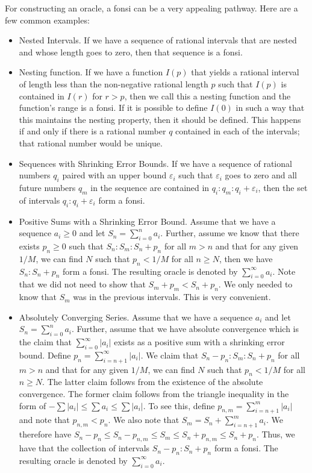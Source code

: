 \documentclass[12pt]{article}
\theoremstyle{remark}
\begin{document}
For constructing an oracle, a fonsi can be a very appealing pathway. Here are a few common examples: 

\begin{itemize}
    \item Nested Intervals. If we have a sequence of rational intervals that are nested and whose length goes to zero, then that sequence is a fonsi.
    \item Nesting function. If we have a function $I(p)$ that yields a rational interval of length less than the non-negative rational length $p$ such that $I(p)$ is contained in $I(r)$ for $r>p$, then we call this a nesting function and the function's range is a fonsi. If it is possible to define $I(0)$ in such a way that this maintains the nesting property, then it should be defined. This happens if and only if there is a rational number $q$ contained in each of the intervals; that rational number would be unique. 
    \item Sequences with Shrinking Error Bounds. If we have a sequence of rational numbers $q_i$ paired with an upper bound $\varepsilon_i$ such that $\varepsilon_i$ goes to zero and all future numbers $q_m$ in the sequence are contained in $q_i:q_m:q_i+\varepsilon_i$, then the set of intervals $q_i:q_i+\varepsilon_i$ form a fonsi. 
    \item Positive Sums with a Shrinking Error Bound. Assume that we have a sequence $a_i\geq 0$ and let $S_n = \sum_{i=0}^n a_i$. Further, assume we know that there exists $p_n \geq 0$ such that $S_n: S_m : S_n + p_n$ for all $m > n$ and that for any given $1/M$, we can find $N$ such that $p_n < 1/M$ for all $n \geq N$, then we have $S_n: S_n + p_n$ form a fonsi. The resulting oracle is denoted by $\sum_{i=0}^\infty a_i$. Note that we did not need to show that $S_m+p_m < S_n + p_n$. We only needed to know that $S_m$ was in the previous intervals. This is very convenient.
    \item Absolutely Converging Series. Assume that we have a sequence $a_i$ and let $S_n = \sum_{i=0}^n a_i$. Further, assume that we have absolute convergence which is the claim that $\sum_{i=0}^\infty |a_i|$ exists as a positive sum  with a shrinking error bound. Define $p_n = \sum_{i=n+1}^\infty |a_i|$. We claim that $S_n-p_n: S_m : S_n + p_n$ for all $m > n$ and that for any given $1/M$, we can find $N$ such that $p_n < 1/M$ for all $n \geq N$. The latter claim follows from the existence of the absolute convergence. The former claim follows from the triangle inequality in the form of $- \sum |a_i| \leq \sum a_i \leq \sum |a_i| $. To see this, define $p_{n,m} = \sum_{i=n+1}^m |a_i|$ and note that $p_{n,m} < p_n$. We also note that $S_m = S_n + \sum_{i=n+1}^m a_i$.  We therefore have  $S_n - p_n \leq S_n - p_{n,m} \leq S_m \leq S_n+ p_{n,m} \leq S_n + p_n$. Thus, we have that the collection of intervals $S_n-p_n: S_n + p_n$ form a fonsi. The resulting oracle is denoted by $\sum_{i=0}^\infty a_i$.
\end{itemize}
\end{document}
